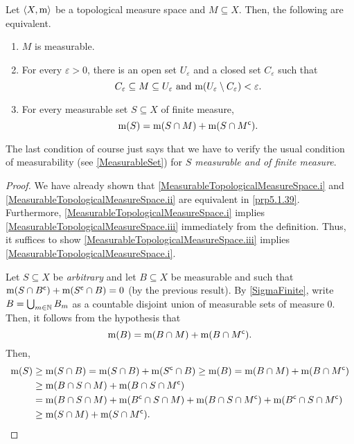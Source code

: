 \begin{thm}\label{MeasurableTopologicalMeasureSpace}
Let $\langle X,\mathrm{m}\rangle$ be a topological measure space and $M\subseteq X$.  Then, the following are equivalent.
\begin{enumerate}
\item \label{MeasurableTopologicalMeasureSpace.i}$M$ is measurable.
\item \label{MeasurableTopologicalMeasureSpace.ii}For every $\varepsilon >0$, there is an open set $U_{\varepsilon}$ and a closed set $C_{\varepsilon}$ such that
\begin{equation}
C_{\varepsilon}\subseteq M\subseteq U_{\varepsilon}\text{ and }\mathrm{m} (U_{\varepsilon}\setminus C_{\varepsilon})<\varepsilon .
\end{equation}
\item \label{MeasurableTopologicalMeasureSpace.iii}For every measurable set $S\subseteq X$ of finite measure,
\begin{equation}
\mathrm{m} (S)=\mathrm{m} (S\cap M)+\mathrm{m} (S\cap M^{\mathsf{c}}).
\end{equation}
\end{enumerate}
\begin{rmk}
The last condition of course just says that we have to verify the usual condition of measurability (see \cref{MeasurableSet}) for \emph{$S$ measurable and of finite measure}.
\end{rmk}
\begin{proof}
We have already shown that \ref{MeasurableTopologicalMeasureSpace.i} and \ref{MeasurableTopologicalMeasureSpace.ii} are equivalent in \cref{prp5.1.39}.  Furthermore, \ref{MeasurableTopologicalMeasureSpace.i} implies \ref{MeasurableTopologicalMeasureSpace.iii} immediately from the definition.  Thus, it suffices to show \ref{MeasurableTopologicalMeasureSpace.iii} implies \ref{MeasurableTopologicalMeasureSpace.i}.

Let $S\subseteq X$ be \emph{arbitrary} and let $B\subseteq X$ be measurable and such that $\mathrm{m} (S\cap B^{\mathsf{c}})+\mathrm{m} (S^{\mathsf{c}}\cap B)=0$ (by the previous result).  By \cref{SigmaFinite}, write $B=\bigcup _{m\in \mathbb{N}}B_m$ as a countable disjoint union of measurable sets of measure $0$.  Then, it follows from the hypothesis that
\begin{equation}
\mathrm{m} (B)=\mathrm{m} (B\cap M)+\mathrm{m} (B\cap M^{\mathsf{c}}).
\end{equation}
Then,
\begin{equation}
\begin{split}
\mathrm{m} (S) & \geq \mathrm{m} (S\cap B)=\mathrm{m} (S\cap B)+\mathrm{m} (S^{\mathsf{c}}\cap B)\geq \mathrm{m} (B)=\mathrm{m} (B\cap M)+\mathrm{m} (B\cap M^{\mathsf{c}}) \\
& \geq \mathrm{m} (B\cap S\cap M)+\mathrm{m} (B\cap S\cap M^{\mathsf{c}}) \\
& =\mathrm{m} (B\cap S\cap M)+\mathrm{m} (B^{\mathsf{c}}\cap S\cap M)+\mathrm{m} (B\cap S\cap M^{\mathsf{c}})+\mathrm{m} (B^{\mathsf{c}}\cap S\cap M^{\mathsf{c}}) \\
& \geq \mathrm{m} (S\cap M)+\mathrm{m} (S\cap M^{\mathsf{c}}).
\end{split}
\end{equation}
\end{proof}
\end{thm}

